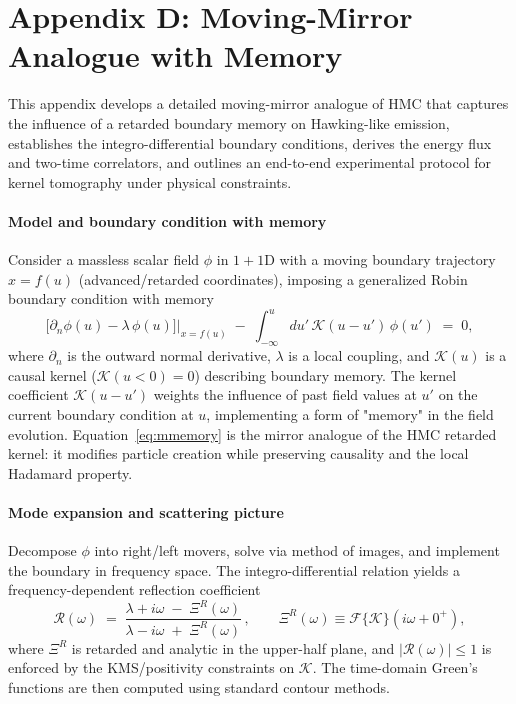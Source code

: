 \documentclass[a4paper,11pt]{article}
\newcommand{\HMC}{\textsc{HMC}\xspace}
\theoremstyle{plain}
\theoremstyle{definition}
\theoremstyle{remark}
\begin{document}
\section{Appendix D: Moving-Mirror Analogue with Memory}
\label{app:moving_mirror}
This appendix develops a detailed moving-mirror analogue of \HMC{} that captures the influence of a retarded boundary memory on Hawking-like emission, establishes the integro-differential boundary conditions, derives the energy flux and two-time correlators, and outlines an end-to-end experimental protocol for kernel tomography under physical constraints.

\paragraph{Model and boundary condition with memory}
Consider a massless scalar field $\phi$ in $1+1$D with a moving boundary trajectory $x=f(u)$ (advanced/retarded coordinates), imposing a generalized Robin boundary condition with memory
\begin{equation}
\left.\Big[\partial_n \phi(u)-\lambda\,\phi(u)\Big]\right|_{x=f(u)}\;-\;\int_{-\infty}^u du'\,\mathcal{K}(u-u')\,\phi(u')\;=\;0,
\label{eq:mmemory}
\end{equation}
where $\partial_n$ is the outward normal derivative, $\lambda$ is a local coupling, and $\mathcal{K}(u)$ is a causal kernel ($\mathcal{K}(u<0)=0$) describing boundary memory. The kernel coefficient $\mathcal{K}(u-u')$ weights the influence of past field values at $u'$ on the current boundary condition at $u$, implementing a form of "memory" in the field evolution. Equation~\eqref{eq:mmemory} is the mirror analogue of the \HMC{} retarded kernel: it modifies particle creation while preserving causality and the local Hadamard property.

\paragraph{Mode expansion and scattering picture}
Decompose $\phi$ into right/left movers, solve via method of images, and implement the boundary in frequency space. The integro-differential relation yields a frequency-dependent reflection coefficient
\begin{equation}
\mathcal{R}(\omega)\;=\;\frac{\lambda+i\omega\;-\;\Xi^R(\omega)}{\lambda-i\omega\;+\;\Xi^R(\omega)}\,,
\qquad \Xi^R(\omega)\equiv \mathcal{F}\{\mathcal{K}\}(i\omega+0^+),
\end{equation}
where $\Xi^R$ is retarded and analytic in the upper-half plane, and $|\mathcal{R}(\omega)|\le 1$ is enforced by the KMS/positivity constraints on $\mathcal{K}$. The time-domain Green's functions are then computed using standard contour methods.
\end{document}
